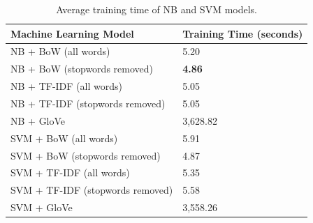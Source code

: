 \documentclass[a4paper,twoside,phd]{BYUPhys}
\begin{document}
\begin{table}[H]
	\centering
	
	\begin{tabular}{|p{4.2cm}|p{5cm}|}
		\hline
		
		\textbf{Machine Learning \newline Model} & \textbf{Training Time (seconds)}                                                                                                                                                                                                                                                                                                                                                    \\
		\hline                                                                                                                                              
		
		NB + BoW (all words)  & 5.20  \\
		\hline
		
		NB + BoW \newline (stopwords  removed)  & \textbf{4.86}  \\
		\hline
		
		NB + TF-IDF \newline (all words) & 5.05 \\
		\hline
		
		NB + TF-IDF \newline (stopwords removed) & 5.05 \\
		\hline
		
		NB + GloVe & 3,628.82 \\
		\hline                                                                                                                                             
		
		SVM + BoW  \newline (all words)  & 5.91  \\
		\hline
		
		SVM + BoW \newline (stopwords removed)  & 4.87  \\
		\hline
		
		SVM + TF-IDF \newline (all words) & 5.35 \\
		\hline
		
		SVM + TF-IDF \newline (stopwords removed) & 5.58 \\
		\hline
		
		SVM + GloVe & 3,558.26 \\
		\hline
		
	\end{tabular}
	\caption{Average training time of NB and SVM models.}
	\label{table:MLTrainingTime}
\end{table}
\end{document}
